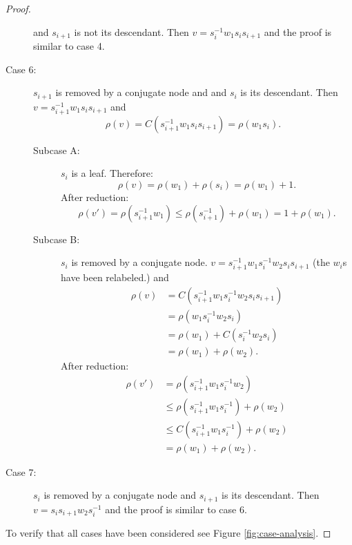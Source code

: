 \documentclass[12pt]{thesis}
\begin{document}
\begin{proof}
\begin{description}
           and $s_{i+1}$ is not its descendant.
           Then $v = s_{i}^{-1} w_{1} s_{i} s_{i+1}$ and
           the proof is similar to case 4.
     \item [Case 6:]
       $s_{i+1}$ is removed by a conjugate
        node and
        and $s_{i}$ is its descendant.
        Then $v = s_{i+1}^{-1} w_{1} s_{i} s_{i+1}$
        and 
        \[
            \rho(v) = C(s_{i+1}^{-1} w_{1} s_{i} s_{i+1}) = \rho(w_{1} s_{i}).
        \]
        \begin{description}
            \item[Subcase A:]
                 $s_{i}$ is a leaf.
                 Therefore:
                    \[
                        \rho(v) = \rho(w_{1}) + \rho(s_{i})
                               = \rho(w_{1}) + 1.
                    \]
                    After reduction:
                    \[
                        \rho(v') = \rho(s_{i+1}^{-1}w_{1})
                               \leq \rho(s_{i+1}^{-1}) + \rho(w_{1})
                              = 1 + \rho(w_{1}).
                    \]
             \item[Subcase B:]
             $s_{i}$ is removed by a conjugate node.
                $v = s_{i+1}^{-1} w_{1} s_{i}^{-1} w_{2} s_{i} s_{i+1}$ (the $w_{i}$s have been relabeled.)
                and
                \[
                 \begin{split}
                     \rho(v) &= C(s_{i+1}^{-1} w_{1} s_{i}^{-1} w_{2} s_{i} s_{i+1})  \\
                     &= \rho(w_{1} s_{i}^{-1} w_{2} s_{i})  \\
                     &= \rho(w_{1}) + C(s_{i}^{-1} w_{2} s_{i}) \\
                     &= \rho(w_{1}) + \rho(w_{2}).
                 \end{split}
                \]
                After reduction:
                \[
                \begin{split}
                    \rho(v') &= \rho(s_{i + 1}^{-1} w_{1} s_{i}^{-1}w_{2}) \\
                    &\leq  \rho(s_{i + 1}^{-1} w_{1} s_{i}^{-1}) + \rho(w_{2}) \\
                    &\leq C(s_{i + 1}^{-1} w_{1} s_{i}^{-1}) + \rho(w_{2}) \\
                    &= \rho(w_{1}) + \rho(w_{2}).
                \end{split}
                \]
            \end{description}
     \item [Case 7:]
         $s_{i}$ is removed by a conjugate node and
         $s_{i+1}$ is its descendant.
         Then $v = s_{i}s_{i+1} w_{2} s_{i}^{-1}$
         and the proof is similar to  case 6. \qedhere
\end{description}
To verify that all cases have been considered see Figure \ref{fig:case-analysis}.
\end{proof}
\end{document}
